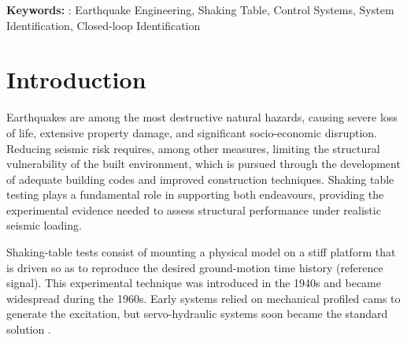 \documentclass[  10pt, twoside]{report} %
\numberwithin{equation}{chapter}
\begin{document}
\vfill

\textbf{Keywords:} : Earthquake Engineering, Shaking Table, Control Systems, System Identification, Closed-loop Identification

\tableofcontents %

\cleardoublepage 

{}
\listoftables %

{}
{}
\listoffigures %


{}
\printnomenclature

\glsaddall
\printglossary[type=\acronymtype,title=\acronymname, toctitle=\acronymname]


\let\oldsection\chapter
\renewcommand{\chapter}{\cleardoublepage\oldsection}

\pagestyle{plain}%
\chapter{Introduction}

Earthquakes are among the most destructive natural hazards, causing severe loss of life, extensive property damage, and significant socio-economic disruption. Reducing seismic risk requires, among other measures, limiting the structural vulnerability of the built environment, which is pursued through the development of adequate building codes and improved construction techniques. Shaking table testing plays a fundamental role in supporting both endeavours, providing the experimental evidence needed to assess structural performance under realistic seismic loading.

Shaking-table tests consist of mounting a physical model on a stiff platform that is driven so as to reproduce the desired ground-motion time history (reference signal). This experimental technique was introduced in the 1940s and became widespread during the 1960s. Early systems relied on mechanical profiled cams to generate the excitation, but servo-hydraulic systems soon became the standard solution \citep{williams2001,carvalho1998,candeias2023}. 
\end{document}
